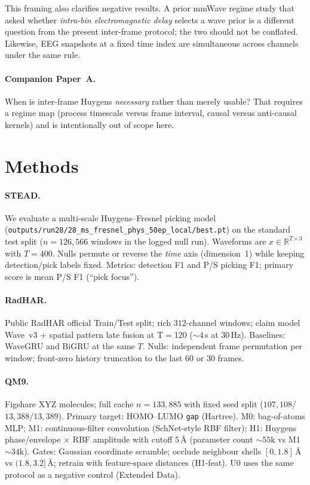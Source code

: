 \documentclass[twocolumn,10pt]{article}
\newcommand{\gap}{\texttt{gap}}
\begin{document}
This framing also clarifies negative results.
A prior mmWave regime study that asked whether \emph{intra-bin electromagnetic
delay} selects a wave prior is a different question from the present
inter-frame protocol; the two should not be conflated.
Likewise, EEG snapshots at a fixed time index are simultaneous across channels
under the same rule.

\paragraph{Companion Paper~A.}
When is inter-frame Huygens \emph{necessary} rather than merely usable?
That requires a regime map (process timescale versus frame interval, causal
versus anti-causal kernels) and is intentionally out of scope here.

\section*{Methods}
\paragraph{STEAD.}
We evaluate a multi-scale Huygens--Fresnel picking model
(\texttt{outputs/run28/28\_ms\_fresnel\_phys\_50ep\_local/best.pt}) on the
standard test split ($n{=}126{,}566$ windows in the logged null run).
Waveforms are $x\in\mathbb{R}^{T\times 3}$ with $T{=}400$.
Nulls permute or reverse the \emph{time} axis (dimension~1) while keeping
detection/pick labels fixed.
Metrics: detection F1 and P/S picking F1; primary score is mean P/S F1
(``pick focus'').

\paragraph{RadHAR.}
Public RadHAR official Train/Test split\cite{singh2019radhar}; rich
$312$-channel windows; claim model Wave~v3 + spatial pattern late fusion at
T$=$120 (${\sim}4$\,s at $30$\,Hz).
Baselines: WaveGRU and BiGRU at the same $T$.
Nulls: independent frame permutation per window; front-zero history truncation
to the last $60$ or $30$ frames.

\paragraph{QM9.}
Figshare XYZ molecules\cite{ramakrishnan2014qm9}; full cache $n{=}133{,}885$ with
fixed seed split ($107{,}108$/$13{,}388$/$13{,}389$).
Primary target: HOMO--LUMO \gap{} (Hartree).
M0: bag-of-atoms MLP; M1: continuous-filter convolution (SchNet-style RBF
filter); H1: Huygens phase/envelope $\times$ RBF amplitude with cutoff
$5$\,\AA{} (parameter count ${\sim}55$k vs M1 ${\sim}34$k).
Gates: Gaussian coordinate scramble; occlude neighbour shells
$[0,1.8]$\,\AA{} vs $(1.8,3.2]$\,\AA{}; retrain with feature-space distances
(H1-feat).
U0 uses the same protocol as a negative control (Extended Data).
\end{document}
